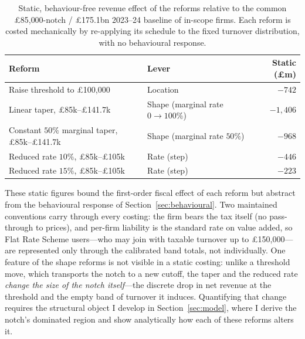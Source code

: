 \begin{table}[htbp]
\centering
\caption{Static, behaviour-free revenue effect of the reforms relative to the
common \pounds85{,}000-notch / \pounds175.1bn 2023--24 baseline of in-scope
firms. Each reform is costed mechanically by re-applying its schedule to the
fixed turnover distribution, with no behavioural response.}
\label{tab:schedule_costs}
\small
\begin{tabularx}{\textwidth}{@{}Xlr@{}}
\toprule
Reform & Lever & Static (\pounds m) \\
\midrule
Raise threshold to \pounds100{,}000 & Location & $-742$ \\
Linear taper, \pounds85k--\pounds141.7k & Shape (marginal rate $0\to100\%$) & $-1{,}406$ \\
Constant $50\%$ marginal taper, \pounds85k--\pounds141.7k & Shape (marginal rate $50\%$) & $-968$ \\
Reduced rate $10\%$, \pounds85k--\pounds105k & Rate (step) & $-446$ \\
Reduced rate $15\%$, \pounds85k--\pounds105k & Rate (step) & $-223$ \\
\bottomrule
\end{tabularx}
\end{table}

These static figures bound the first-order fiscal effect of each reform but
abstract from the behavioural response of Section~\ref{sec:behavioural}. Two
maintained conventions carry through every costing: the firm bears the tax
itself (no pass-through to prices), and per-firm
liability is the standard rate on value added, so Flat Rate Scheme users---who
may join with taxable turnover up to \pounds150{,}000---are
represented only through the calibrated band totals, not individually. One feature
of the shape reforms is not visible in a static costing: unlike a threshold move,
which transports the notch to a new cutoff, the taper and the reduced rate
\emph{change the size of the notch itself}---the discrete drop in net revenue at the
threshold and the empty band of turnover it induces. Quantifying that change
requires the structural object I develop in Section~\ref{sec:model}, where I derive
the notch's dominated region and show analytically how each of these reforms alters
it.
